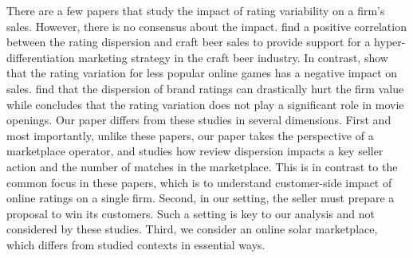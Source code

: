 \documentclass[msom,blindrev]{informs3}
\begin{document}
There are a few papers that study the impact of rating variability on a firm's sales. However, there is no consensus
about the impact. \cite{clemons2006online} find a positive correlation between the rating dispersion and craft beer sales to provide support for a hyper-differentiation marketing strategy in the craft beer industry. In contrast, \cite{Zhu} show that the rating variation for less popular online games has a negative impact on sales. \cite{luo2013impact} find that the dispersion of brand ratings can drastically hurt the firm value while \cite{zhang2006tapping} concludes that the rating variation does not play a significant role in movie openings. Our paper differs from these studies in several dimensions. First and most importantly, unlike these papers, our paper takes the perspective of a marketplace operator, and studies how review dispersion impacts a key seller action and the number of matches in the marketplace. This is in contrast to the common focus in these papers, which is to understand customer-side impact of online ratings on a single firm. Second, in our setting, the seller must prepare a proposal to win its customers. Such a setting is key to our analysis and not considered by these studies. Third, we consider an online solar marketplace, which differs from studied contexts in essential ways.
\end{document}
